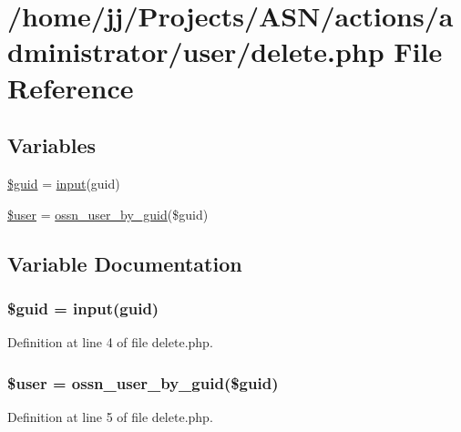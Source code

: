 \hypertarget{actions_2administrator_2user_2delete_8php}{}\section{/home/jj/\+Projects/\+A\+S\+N/actions/administrator/user/delete.php File Reference}
\label{actions_2administrator_2user_2delete_8php}
\subsection*{Variables}
\begin{DoxyCompactItemize}
\item 
\hyperlink{actions_2administrator_2user_2delete_8php_af99126304cbcb2e1483892c40bb3aae4}{\$guid} = \hyperlink{ossn_8lib_8input_8php_a64ebee98b041c4f75f71ed3cd73cc8ed}{input}(\textquotesingle{}guid\textquotesingle{})
\item 
\hyperlink{actions_2administrator_2user_2delete_8php_a598ca4e71b15a1313ec95f0df1027ca5}{\$user} = \hyperlink{ossn_8lib_8users_8php_aaee344fada9e6e15470587c7cd94ea8b}{ossn\+\_\+user\+\_\+by\+\_\+guid}(\$guid)
\end{DoxyCompactItemize}


\subsection{Variable Documentation}
\subsubsection[{\texorpdfstring{\$guid}{$guid}}]{\setlength{\rightskip}{0pt plus 5cm}\$guid = {\bf input}(\textquotesingle{}guid\textquotesingle{})}\hypertarget{actions_2administrator_2user_2delete_8php_af99126304cbcb2e1483892c40bb3aae4}{}\label{actions_2administrator_2user_2delete_8php_af99126304cbcb2e1483892c40bb3aae4}


Definition at line 4 of file delete.\+php.

\subsubsection[{\texorpdfstring{\$user}{$user}}]{\setlength{\rightskip}{0pt plus 5cm}\${\bf user} = {\bf ossn\+\_\+user\+\_\+by\+\_\+guid}(\$guid)}\hypertarget{actions_2administrator_2user_2delete_8php_a598ca4e71b15a1313ec95f0df1027ca5}{}\label{actions_2administrator_2user_2delete_8php_a598ca4e71b15a1313ec95f0df1027ca5}


Definition at line 5 of file delete.\+php.

